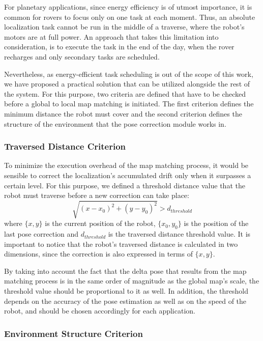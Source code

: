For planetary applications, since energy efficiency is of utmost importance,
it is common for rovers to focus only on one task at each moment.
Thus, an absolute localization task cannot be run in the middle of
a traverse, where the robot's motors are at full power.
An approach that takes this limitation into consideration, is to execute
the task in the end of the day, when the rover recharges and only
secondary tasks are scheduled.

Nevertheless, as energy-efficient task scheduling is out
of the scope of this work, we have proposed a practical solution that
can be utilized alongside the rest of the system.
For this purpose, two criteria are defined that have to be checked before
a global to local map matching is initiated.
The first criterion defines the minimum distance the robot must cover
and the second criterion defines the structure of the environment that the
pose correction module works in.

\subsubsection{Traversed Distance Criterion}

To minimize the execution overhead of the map matching process, it would
be sensible to correct the localization's accumulated drift only when
it surpasses a certain level.
For this purpose, we defined a threshold distance value that the robot must
traverse before a new correction can take place:
\begin{equation}
    \sqrt{(x - x_0)^2 + (y - y_0)^2} > d_{threshold}
\end{equation}
where
$\{x, y\}$ is the current position of the robot,
$\{x_0, y_0\}$ is the position of the last pose correction and
$d_{threshold}$ is the traversed distance threshold value.
It is important to notice that the robot's traversed distance is calculated
in two dimensions, since the correction is also expressed in terms of
$\{x, y\}$.

By taking into account the fact that the delta pose that results from the
map matching process is in the same order of magnitude as the global map's
scale, the threshold value should be proportional to it as well.
In addition, the threshold depends on the accuracy of the pose estimation
as well as on the speed of the robot, and should be chosen accordingly for
each application.

\subsubsection{Environment Structure Criterion}

